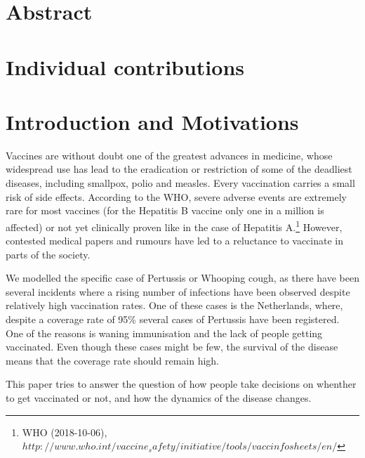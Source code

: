 \documentclass[11pt]{article}
\begin{document}

\tableofcontents

\newpage




\section{Abstract}



\section{Individual contributions}

\section{Introduction and Motivations}

Vaccines are without doubt one of the greatest advances in medicine, whose widespread use has lead to the eradication or restriction of some of the deadliest diseases, including smallpox, polio and measles. Every vaccination carries a small risk of side effects. According to the WHO, severe adverse events are extremely rare for most vaccines (for the Hepatitis B vaccine only one in a million is affected) or not yet clinically proven like in the case of Hepatitis A.\footnote{WHO (2018-10-06), $http://www.who.int/vaccine_safety/initiative/tools/vaccinfosheets/en/$}  However, contested medical papers and rumours have led to a reluctance to vaccinate in parts of the society.

\vspace{14px}

We modelled the specific case of Pertussis or Whooping cough, as there have been several incidents where a rising number of infections have been observed despite relatively high vaccination rates. One of these cases is the Netherlands, where, despite a coverage rate of 95\% several cases of Pertussis have been registered. One of the reasons is waning immunisation and the lack of people getting vaccinated. Even though these cases might be few, the survival of the disease means that the coverage rate should remain high. 

This paper tries to answer the question of how people take decisions on whenther to get vaccinated or not, and how the dynamics of the disease changes. 
\end{document}
